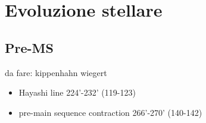 \section{Evoluzione stellare}

\subsection{Pre-MS}

\begin{wordonframe}{da fare: kippenhahn wiegert}
	\begin{itemize}
		\item Hayashi line 224'-232' (119-123)
		\item pre-main sequence contraction 266'-270' (140-142)
	\end{itemize}
\end{wordonframe}


